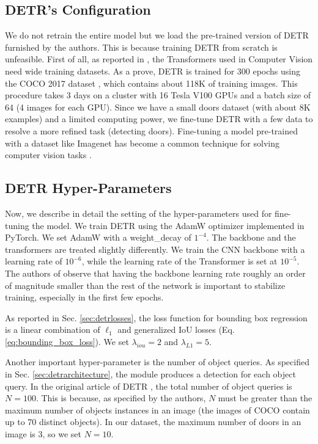 \subsection{DETR's Configuration}
\label{sec:detr_configuration}
We do not retrain the entire model but we load the pre-trained version of DETR furnished by the authors. This is because training DETR from scratch is unfeasible. First of all, as reported in \cite{surveytransformer}, the Transformers used in Computer Vision need wide training datasets. As a prove, DETR is trained for 300 epochs using the COCO 2017 dataset \cite{coco}, which contains about 118K of training images. This procedure takes 3 days on a cluster with 16 Tesla V100 GPUs and a batch size of 64 (4 images for each GPU). Since we have a small doors dataset (with about 8K examples) and a limited computing power, we fine-tune DETR with a few data to resolve a more refined task (detecting doors). Fine-tuning a model pre-trained with a dataset like Imagenet \cite{imagenet} has become a common technique for solving computer vision tasks \cite{verydeepimagenet, resnet, fasterrcnn, yolo, yolov2}.

\subsection{DETR Hyper-Parameters}
Now, we describe in detail the setting of the hyper-parameters used for fine-tuning the model. We train DETR using the AdamW  \cite{adamw} optimizer implemented in PyTorch. We set AdamW with a \textsf{weight\_decay} of $1^{-4}$. The backbone and the transformers are treated slightly differently.  We train the CNN backbone with a learning rate of $10^{-6}$, while the learning rate of the Transformer is set at $10^{-5}$. The authors of \cite{detr} observe that having the backbone learning rate roughly an order of magnitude smaller than the rest of the network is important to stabilize training, especially in the first few epochs. 

As reported in Sec. \ref{sec:detrlosses}, the loss function for bounding box regression is a linear combination of $\ell_1$ and generalized IoU \cite{generalizediou} losses (Eq. \ref{eq:bounding_box_loss}). We set $\lambda_{iou} = 2$ and $\lambda_{L1} = 5$.

Another important hyper-parameter is the number of object queries. As specified in Sec. \ref{sec:detrarchitecture}, the module produces a detection for each object query. In the original article of DETR \cite{detr}, the total number of object queries is  $N = 100$. This is because, as specified by the authors, $N$ must be greater than the maximum number of objects instances in an image (the images of COCO contain up to 70 distinct objects). In our dataset, the maximum number of doors in an image is 3, so we set $N = 10$.

